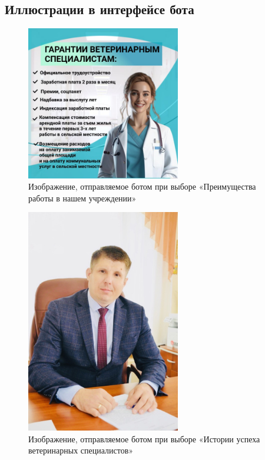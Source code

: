 \documentclass[a4paper,12pt]{article} %
\begin{document}
\subsection{Иллюстрации в интерфейсе бота} %
\begin{figure}[h!]
\centering
\includegraphics[width=0.6\textwidth]{guarantees.jpg}
\caption{Изображение, отправляемое ботом при выборе «Преимущества работы в нашем учреждении»} %
\end{figure}

\begin{figure}[h!]
\centering
\includegraphics[width=0.6\textwidth]{thestory.jpg}
\caption{Изображение, отправляемое ботом при выборе «Истории успеха ветеринарных специалистов»} %
\end{figure}
\end{document}
